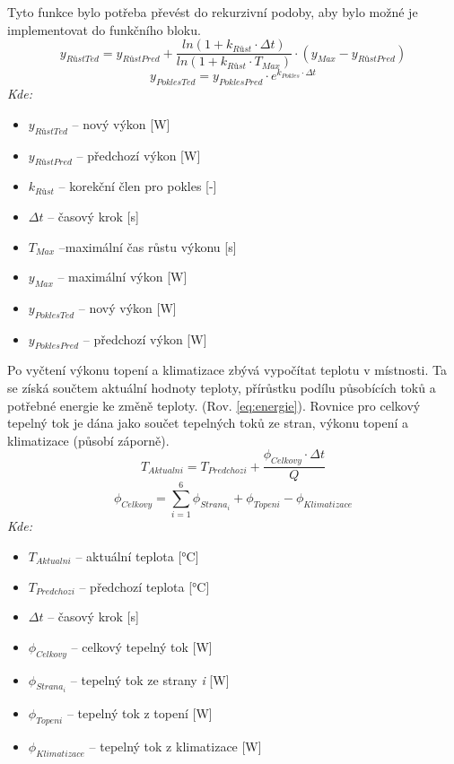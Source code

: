\noindent Tyto funkce bylo potřeba převést do rekurzivní podoby, aby bylo možné je implementovat do funkčního bloku.
\begin{equation}
    y_{RůstTed} = y_{RůstPred} + \frac{ln(1 + k_{Růst} \cdot \Delta t)}{ln(1 + k_{Růst} \cdot T_{Max})} \cdot (y_{Max} - y_{RůstPred}) 
    \label{eq:rust_rekurzivni}
\end{equation}
\begin{equation}
    y_{PoklesTed} = y_{PoklesPred} \cdot e^{k_{Pokles} \cdot \Delta t}
    \label{eq:pokles_rekurzivni}
\end{equation}
\noindent\textit{Kde:}
\begin{itemize}
    \item $y_{RůstTed}$ -- nový výkon [W]
    \item $y_{RůstPred}$ -- předchozí výkon [W]
    \item $k_{Růst}$ -- korekční člen pro pokles [-]
    \item $\Delta t$ -- časový krok [s]
    \item $T_{Max}$ --maximální čas růstu výkonu [s]
    \item $y_{Max}$ -- maximální výkon [W]
    \item $y_{PoklesTed}$ -- nový výkon [W]
    \item $y_{PoklesPred}$ -- předchozí výkon [W] \newline
\end{itemize}
\noindent Po vyčtení výkonu topení a klimatizace zbývá vypočítat teplotu v místnosti. Ta se získá součtem aktuální hodnoty teploty, přírůstku podílu působících toků a potřebné energie ke změně teploty. (Rov. \ref{eq:energie}). Rovnice pro celkový tepelný tok je dána jako součet tepelných toků ze stran, výkonu topení a klimatizace (působí záporně).
\begin{equation}
    T_{Aktualni} = T_{Predchozi} + \frac{\phi _{Celkovy} \cdot \Delta t}{Q}
    \label{eq:aktualni_teplota}
\end{equation}
\begin{equation}
    \phi _{Celkovy} = \sum_{i=1}^{6} \phi _{Strana_i} + \phi _{Topeni} - \phi _{Klimatizace}
    \label{eq:celkovy_tepelny_tok}
\end{equation}
\noindent\textit{Kde:}
\begin{itemize}
    \item $T_{Aktualni}$ -- aktuální teplota [°C]
    \item $T_{Predchozi}$ -- předchozí teplota [°C]
    \item $\Delta t$ -- časový krok [s]
    \item $\phi _{Celkovy}$ -- celkový tepelný tok [W]
    \item $\phi _{Strana_i}$ -- tepelný tok ze strany \textit{i} [W]
    \item $\phi _{Topeni}$ -- tepelný tok z topení [W]
    \item $\phi _{Klimatizace}$ -- tepelný tok z klimatizace [W] \newline
\end{itemize}

